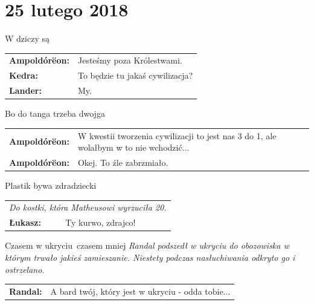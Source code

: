 \documentclass[10pt,twoside,twocolumn]{book}
\begin{document}
\section*{25 lutego 2018}

\begin{rpg-quotebox}{W dziczy są}
   \begin{tabularx}{\columnwidth}{lX}
      \textbf{Ampoldórëon:} & Jesteśmy poza Królestwami.\\
      \textbf{Kedra:} & To będzie tu jakaś cywilizacja?\\
      \textbf{Lander:} & My.\\
   \end{tabularx}
\end{rpg-quotebox}

\begin{rpg-quotebox}{Bo do tanga trzeba dwojga}
   \begin{tabularx}{\columnwidth}{lX}
      \textbf{Ampoldórëon:} & W kwestii tworzenia cywilizacji to jest nas 3 do 1, ale wolałbym w to nie wchodzić...\\
      \textbf{Ampoldórëon:} & Okej. To źle zabrzmiało.\\
   \end{tabularx}
\end{rpg-quotebox}

\begin{rpg-quotebox}{Plastik bywa zdradziecki}
   \begin{tabularx}{\columnwidth}{lX}
      \multicolumn{2}{l}{\textit{Do kostki, która Matheusowi wyrzuciła 20.}}\\
      \textbf{Łukasz:} & Ty kurwo, zdrajco!\\
   \end{tabularx}
\end{rpg-quotebox}

\begin{rpg-quotebox}{Czasem w ukryciu\, czasem mniej}
   \textit{Randal podszedł w ukryciu do obozowiska w którym trwało jakieś zamieszanie. Niestety podczas nasłuchiwania odkryto go i ostrzelano.}\\

   \begin{tabularx}{\columnwidth}{lX}
      \textbf{Randal:} & A bard twój, który jest w ukryciu - odda tobie...\\
   \end{tabularx}
\end{rpg-quotebox}
\end{document}
